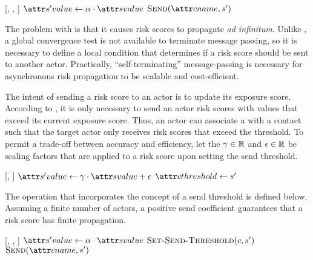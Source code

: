 \begin{function}[H]{\nApplyRiskScore}[\vActor, \vContact, \vScore]
  \If{$\aContactTime + \pTimeBuffer > \aScoreTime$}
    \State $\aNewScoreValue \assign \pTransmissionRate \cdot \aScoreValue$ \label{step:scale-by-transmission-rate}
    \State $\cSend[\aContactName, \vNewScore]$
  \EndIf
\end{function}

The problem with \cApplyRiskScore is that it causes risk scores to propagate \textit{ad infinitum}. Unlike \cRiskPropagation, a global convergence test is not available to terminate message passing, so it is necessary to define a local condition that determines if a risk score should be sent to another actor. Practically, ``self-terminating'' message-passing is necessary for asynchronous risk propagation to be scalable and cost-efficient.

The intent of sending a risk score to an actor is to update its exposure score. According to \cHandleRiskScore, it is only necessary to send an actor risk scores with values that exceed its current exposure score. Thus, an actor can associate a  with a contact such that the target actor only receives risk scores that exceed the threshold. To permit a trade-off between accuracy and efficiency, let the  $\gamma \in \mathbb{R}$ and  $\epsilon \in \mathbb{R}$ be scaling factors that are applied to a risk score upon setting the send threshold.

\begin{function}{\nSetSendThreshold}[\vContact, \vScore]
  \State $\aNewScoreValue \assign \pSendCoefficient \cdot \aScoreValue + \pTolerance$
  \State $\aContactThreshold \assign \vNewScore$
\end{function}

The \cApplyRiskScore operation that incorporates the concept of a send threshold is defined below. Assuming a finite number of actors, a positive send coefficient guarantees that a risk score has finite propagation.

\begin{function}{\nApplyRiskScore}[\vActor, \vContact, \vScore]
  \If{$\aContactThresholdValue < \aScoreValue \AND \aContactTime + \pTimeBuffer > \aScoreTime$}
    \State $\aNewScoreValue \assign \pTransmissionRate \cdot \aScoreValue$
    \State $\cSetSendThreshold[\vContact, \vNewScore]$
    \State $\cSend[\aContactName, \vNewScore]$
  \EndIf
\end{function}

